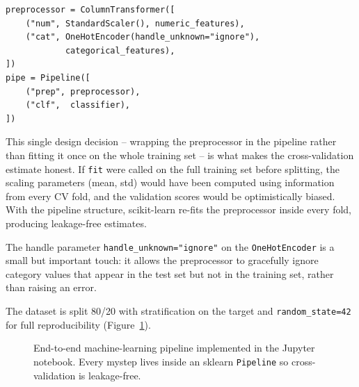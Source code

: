 \documentclass[11pt,a4paper]{article}
\begin{document}
\begin{lstlisting}
preprocessor = ColumnTransformer([
    ("num", StandardScaler(), numeric_features),
    ("cat", OneHotEncoder(handle_unknown="ignore"),
            categorical_features),
])
pipe = Pipeline([
    ("prep", preprocessor),
    ("clf",  classifier),
])
\end{lstlisting}

This single design decision -- wrapping the preprocessor in the
pipeline rather than fitting it once on the whole training set -- is
what makes the cross-validation estimate honest. If \texttt{fit} were
called on the full training set before splitting, the scaling
parameters (mean, std) would have been computed using information
from every CV fold, and the validation scores would be optimistically
biased. With the pipeline structure, scikit-learn re-fits the
preprocessor inside every fold, producing leakage-free estimates.

The handle parameter \texttt{handle\_unknown="ignore"} on the
\texttt{OneHotEncoder} is a small but important touch: it allows the
preprocessor to gracefully ignore category values that appear in the
test set but not in the training set, rather than raising an error.

The dataset is split 80/20 with stratification on the target and
\texttt{random\_state=42} for full reproducibility
(Figure~\ref{fig:ml-pipeline}).

\begin{figure}[h]
\centering
{}
\caption{End-to-end machine-learning pipeline implemented in the
Jupyter notebook. Every mystep lives inside an sklearn \texttt{Pipeline}
so cross-validation is leakage-free.}
\label{fig:ml-pipeline}
\end{figure}
\end{document}
